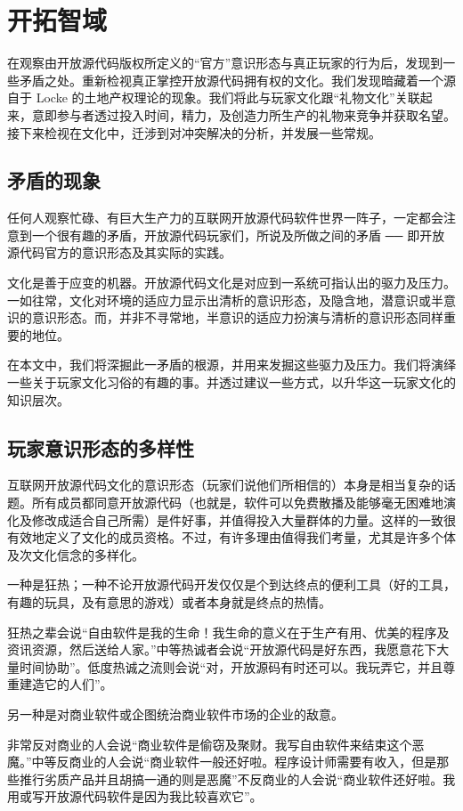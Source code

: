 \section{开拓智域}
在观察由开放源代码版权所定义的“官方”意识形态与真正玩家的行为后，发现到一些矛盾之处。重新检视真正掌控开放源代码拥有权的文化。我们发现暗藏着一个源自于 Locke 的土地产权理论的现象。我们将此与玩家文化跟“礼物文化”关联起来，意即参与者透过投入时间，精力，及创造力所生产的礼物来竞争并获取名望。接下来检视在文化中，迁涉到对冲突解决的分析，并发展一些常规。

\subsection{矛盾的现象}
任何人观察忙碌、有巨大生产力的互联网开放源代码软件世界一阵子，一定都会注意到一个很有趣的矛盾，开放源代码玩家们，所说及所做之间的矛盾 ── 即开放源代码官方的意识形态及其实际的实践。

文化是善于应变的机器。开放源代码文化是对应到一系统可指认出的驱力及压力。一如往常，文化对环境的适应力显示出清析的意识形态，及隐含地，潜意识或半意识的意识形态。而，并非不寻常地，半意识的适应力扮演与清析的意识形态同样重要的地位。

在本文中，我们将深掘此一矛盾的根源，并用来发掘这些驱力及压力。我们将演绎一些关于玩家文化习俗的有趣的事。并透过建议一些方式，以升华这一玩家文化的知识层次。

\subsection{玩家意识形态的多样性}
互联网开放源代码文化的意识形态（玩家们说他们所相信的）本身是相当复杂的话题。所有成员都同意开放源代码（也就是，软件可以免费散播及能够毫无困难地演化及修改成适合自己所需）是件好事，并值得投入大量群体的力量。这样的一致很有效地定义了文化的成员资格。不过，有许多理由值得我们考量，尤其是许多个体及次文化信念的多样化。

一种是狂热；一种不论开放源代码开发仅仅是个到达终点的便利工具（好的工具，有趣的玩具，及有意思的游戏）或者本身就是终点的热情。

狂热之辈会说“自由软件是我的生命！我生命的意义在于生产有用、优美的程序及资讯资源，然后送给人家。”中等热诚者会说“开放源代码是好东西，我愿意花下大量时间协助”。低度热诚之流则会说“对，开放源码有时还可以。我玩弄它，并且尊重建造它的人们”。

另一种是对商业软件或企图统治商业软件市场的企业的敌意。

非常反对商业的人会说“商业软件是偷窃及聚财。我写自由软件来结束这个恶魔。”中等反商业的人会说“商业软件一般还好啦。程序设计师需要有收入，但是那些推行劣质产品并且胡搞一通的则是恶魔”不反商业的人会说“商业软件还好啦。我用或写开放源代码软件是因为我比较喜欢它”。

